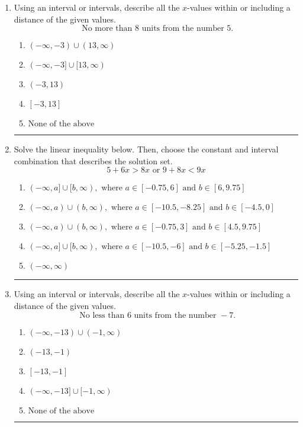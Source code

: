 \documentclass[14pt]{extbook}
\newcommand{\litem}[1]{\item#1\hspace*{-1cm}\rule{\textwidth}{0.4pt}}
\begin{document}
\begin{enumerate}
{\begin{enumerate}[label=\Alph*.]
\end{enumerate} }
\litem{
Using an interval or intervals, describe all the $x$-values within or including a distance of the given values.\[ \text{ No more than } 8 \text{ units from the number } 5. \]\begin{enumerate}[label=\Alph*.]
\item \( (-\infty, -3) \cup (13, \infty) \)
\item \( (-\infty, -3] \cup [13, \infty) \)
\item \( (-3, 13) \)
\item \( [-3, 13] \)
\item \( \text{None of the above} \)

\end{enumerate} }
\litem{
Solve the linear inequality below. Then, choose the constant and interval combination that describes the solution set.\[ 5 + 6 x > 8 x \text{ or } 9 + 8 x < 9 x \]\begin{enumerate}[label=\Alph*.]
\item \( (-\infty, a] \cup [b, \infty), \text{ where } a \in [-0.75, 6] \text{ and } b \in [6, 9.75] \)
\item \( (-\infty, a) \cup (b, \infty), \text{ where } a \in [-10.5, -8.25] \text{ and } b \in [-4.5, 0] \)
\item \( (-\infty, a) \cup (b, \infty), \text{ where } a \in [-0.75, 3] \text{ and } b \in [4.5, 9.75] \)
\item \( (-\infty, a] \cup [b, \infty), \text{ where } a \in [-10.5, -6] \text{ and } b \in [-5.25, -1.5] \)
\item \( (-\infty, \infty) \)

\end{enumerate} }
\litem{
Using an interval or intervals, describe all the $x$-values within or including a distance of the given values.\[ \text{ No less than } 6 \text{ units from the number } -7. \]\begin{enumerate}[label=\Alph*.]
\item \( (-\infty, -13) \cup (-1, \infty) \)
\item \( (-13, -1) \)
\item \( [-13, -1] \)
\item \( (-\infty, -13] \cup [-1, \infty) \)
\item \( \text{None of the above} \)


\end{enumerate}}
\end{enumerate}
\end{document}
